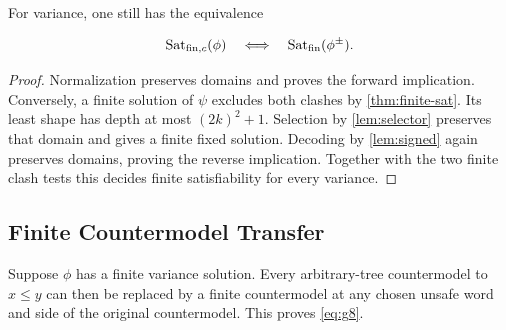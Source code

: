 \begin{lemma}\label{lem:finite-signed}
For variance, one still has the equivalence

\begin{equation}\label{eq:g59}
\operatorname{Sat}_{\mathrm{fin},c}(\phi)
 \quad\Longleftrightarrow\quad
 \operatorname{Sat}_{\mathrm{fin}}(\phi^{\pm}).
\end{equation}

\end{lemma}

\begin{proof}
Normalization preserves domains and proves the forward implication.
Conversely, a finite solution of $\psi$ excludes both clashes by
\cref{thm:finite-sat}. Its least shape has depth at most $(2k)^2+1$.
Selection by \cref{lem:selector} preserves that domain and gives a finite
fixed solution. Decoding by \cref{lem:signed} again preserves domains,
proving the reverse implication. Together with the two finite clash tests
this decides finite satisfiability for every variance.
\end{proof}

\subsection{Finite Countermodel Transfer}\label{sec:finite-transfer}
\begin{theorem}\label{thm:finite-transfer}
Suppose $\phi$ has a finite variance solution. Every arbitrary-tree
countermodel to $x\le y$ can then be replaced by a finite countermodel
at any chosen unsafe word and side of the original countermodel.
This proves \eqref{eq:g8}.
\end{theorem}

